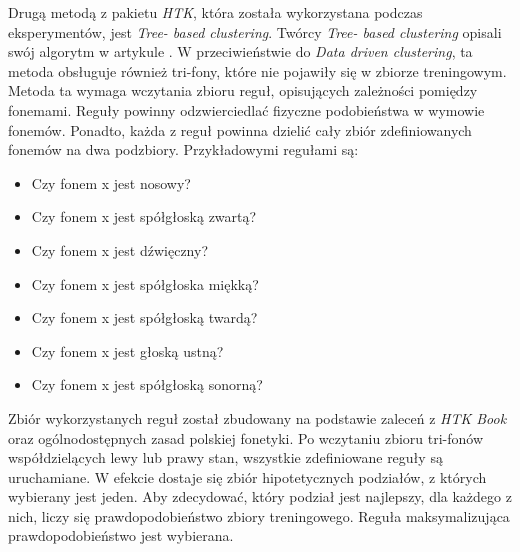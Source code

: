 \documentclass[shortabstract, mgr]{iithesis}
\begin{document}
	Drugą metodą z pakietu \textit{HTK}, która została wykorzystana podczas eksperymentów, jest \textit{Tree- based clustering}. Twórcy \textit{Tree- based clustering} opisali swój algorytm w artykule \cite{tree_based_clustring}. W przeciwieństwie do \textit{Data driven clustering}, ta metoda obsługuje również tri-fony, które nie pojawiły się w zbiorze treningowym. Metoda ta wymaga wczytania zbioru reguł, opisujących zależności pomiędzy fonemami. Reguły powinny odzwierciedlać fizyczne podobieństwa w wymowie fonemów. Ponadto, każda z reguł powinna dzielić cały zbiór zdefiniowanych fonemów na dwa podzbiory. Przykładowymi regułami są:
	\begin{itemize}
		\item Czy fonem x jest nosowy?
		\item Czy fonem x jest spółgłoską zwartą?
		\item Czy fonem x jest dźwięczny?
		\item Czy fonem x jest spółgłoska miękką?
		\item Czy fonem x jest spółgłoską twardą?
		\item Czy fonem x jest głoską ustną? 
		\item Czy fonem x jest spółgłoską sonorną? 
	\end{itemize}
	 Zbiór wykorzystanych reguł został zbudowany na podstawie zaleceń z \textit{HTK Book}\cite{htkbook} oraz ogólnodostępnych zasad polskiej fonetyki. Po wczytaniu zbioru tri-fonów współdzielących lewy lub prawy stan, wszystkie zdefiniowane reguły są uruchamiane. W efekcie dostaje się zbiór hipotetycznych podziałów, z których wybierany jest jeden. Aby zdecydować, który podział jest najlepszy, dla każdego z nich, liczy się prawdopodobieństwo zbiory treningowego. Reguła maksymalizująca prawdopodobieństwo jest wybierana. \\
\end{document}
